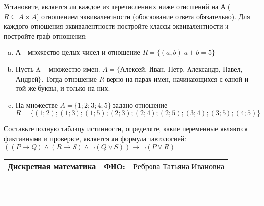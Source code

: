 \documentclass[10pt]{exam}
\newcommand{\class}{Дискретная математика}
\newcommand{\examdate}{}
\begin{document}
\begin{questions}
\question
Установите, является ли каждое из перечисленных ниже отношений на А ($R \subseteq A \times A$) отношением эквивалентности (обоснование ответа обязательно). Для каждого отношения эквивалентности постройте классы 
эквивалентности и постройте граф отношения:
\begin{enumerate} [a)]\setcounter{enumi}{0}
\item А - множество целых чисел и отношение $R = \{(a,b)|a + b = 5\}$
\item Пусть A – множество имен. $A = \{ $Алексей, Иван, Петр, Александр, Павел, Андрей$ \}$. Тогда отношение $R $ верно на парах имен, начинающихся с одной и той же буквы, и только на них.
\item На множестве $A = \{1; 2; 3; 4; 5\}$ задано отношение $R = \{(1; 2); (1; 3); (1; 5); (2; 3); (2; 4); (2; 5); (3; 4); (3; 5); (4; 5)\}$
\end{enumerate}\question Составьте полную таблицу истинности, определите, какие переменные являются фиктивными и проверьте, является ли формула тавтологией:
$((P \rightarrow Q) \land (R \rightarrow S) \land \neg (Q \lor S)) \rightarrow \neg (P \lor R)$

\end{questions}
\newpage
\begin{flushright}
\begin{tabular}{p{2.8in} r l}
\textbf{\class} & \textbf{ФИО:} &Реброва Татьяна Ивановна
\\

\textbf{\examdate} &&\\
\end{tabular}\\
\end{flushright}
\rule[1ex]{\textwidth}{.1pt}
\end{document}
